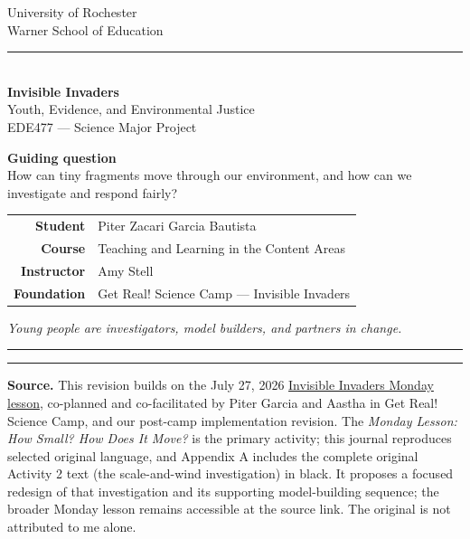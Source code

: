 \documentclass[11pt]{article}
\newcommand{\secx}[1]{\par\Needspace{5\baselineskip}\addvspace{0.10in}{\Large\bfseries\color{PrimaryRed}#1}\par\color{DeepNavy}\hrule\color{black}\vspace{0.08in}}
\begin{document}
\begin{titlepage}\thispagestyle{empty}\begin{center}
{\large University of Rochester\\ Warner School of Education}\\[0.18in]
{\color{PrimaryRed}\rule{\textwidth}{1.5pt}}\\[0.2in]
{\Huge\bfseries Invisible Invaders}\\[0.15in]
{\LARGE Youth, Evidence, and Environmental Justice}\\[0.17in]
{\Large EDE477 --- Science Major Project}\\[0.15in]
\vfill\begin{focusbox}\centering\textbf{Guiding question}\\ How can tiny fragments move through our environment, and how can we investigate and respond fairly?\end{focusbox}\vfill
\begin{tabular}{rl}\textbf{Student} & Piter Zacari Garcia Bautista \\
\textbf{Course} & Teaching and Learning in the Content Areas \\
\textbf{Instructor} & Amy Stell \\
\textbf{Foundation} & Get Real! Science Camp --- Invisible Invaders\end{tabular}\vfill
{\itshape Young people are investigators, model builders, and partners in change.}\par
{\color{PrimaryRed}\rule{5in}{0.8pt}}\end{center}\end{titlepage}
\pagestyle{fancy}\fancyhf{}\cfoot{\thepage}\setlength{\headheight}{14pt}
\secx{Original Activity and Purpose}
\textbf{Source.} This revision builds on the July 27, 2026 \href{https://docs.google.com/document/d/1jc_dSOKXVhSoSbvfbivXlgfYOxrrJ2L6KwbR7LQZCLc/edit}{Invisible Invaders Monday lesson}, co-planned and co-facilitated by Piter Garcia and Aastha in Get Real! Science Camp, and our post-camp implementation revision. The \textit{Monday Lesson: How Small? How Does It Move?} is the primary activity; this journal reproduces selected original language, and Appendix A includes the complete original Activity 2 text (the scale-and-wind investigation) in black. It proposes a focused redesign of that investigation and its supporting model-building sequence; the broader Monday lesson remains accessible at the source link. The original is not attributed to me alone.
\end{document}
